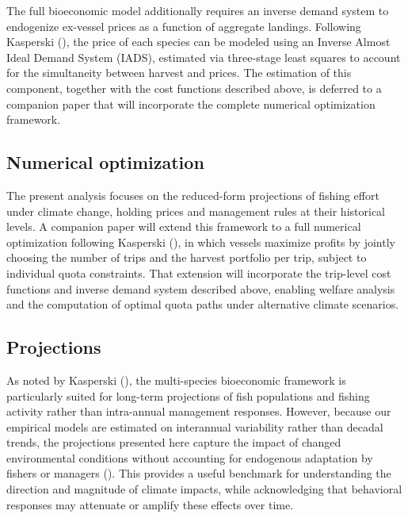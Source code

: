 \documentclass[
  11pt,
]{article}
\begin{document}
The full bioeconomic model additionally requires an inverse demand system to endogenize ex-vessel prices as a function of aggregate landings. Following Kasperski (), the price of each species can be modeled using an Inverse Almost Ideal Demand System (IADS), estimated via three-stage least squares to account for the simultaneity between harvest and prices. The estimation of this component, together with the cost functions described above, is deferred to a companion paper that will incorporate the complete numerical optimization framework.

\subsection{Numerical optimization}\label{numerical-optimization}

The present analysis focuses on the reduced-form projections of fishing effort under climate change, holding prices and management rules at their historical levels. A companion paper will extend this framework to a full numerical optimization following Kasperski (), in which vessels maximize profits by jointly choosing the number of trips and the harvest portfolio per trip, subject to individual quota constraints. That extension will incorporate the trip-level cost functions and inverse demand system described above, enabling welfare analysis and the computation of optimal quota paths under alternative climate scenarios.

\subsection{Projections}\label{projections}

As noted by Kasperski (), the multi-species bioeconomic framework is particularly suited for long-term projections of fish populations and fishing activity rather than intra-annual management responses. However, because our empirical models are estimated on interannual variability rather than decadal trends, the projections presented here capture the impact of changed environmental conditions without accounting for endogenous adaptation by fishers or managers (). This provides a useful benchmark for understanding the direction and magnitude of climate impacts, while acknowledging that behavioral responses may attenuate or amplify these effects over time.
\end{document}
